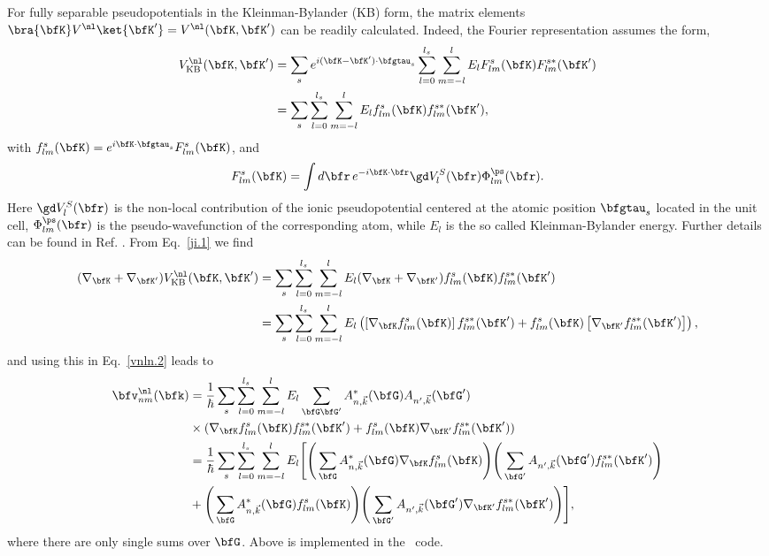 For fully  separable pseudopotentials in the  
Kleinman-Bylander (KB) form,\cite{mottaCMS10,kleinman_efficacious_1982,adolphPRB96} 
the
matrix elements 
 $\bra{\bfK}
V^\nl
\ket{\bfK'}
=V^\nl(\bfK,\bfK')
$
can be readily calculated. \cite{mottaCMS10}
Indeed,
the Fourier representation assumes 
the form,\cite{adolphPRB96,gordienkoRPJ04,fuchsCPC99}
\begin{align}\label{ji.1} 
V^\nl_{\mathrm{KB}}(\bfK,\bfK')  
 &= 
\sum_s e^{i(\bfK-\bfK')\cdot\bfgtau_s}
\sum_{l=0}^{l_s}\sum_{m=-l}^{l}E_lF_{lm}^s(\bfK)F_{lm}^{s*}(\bfK')  
\nonumber\\
 &= 
\sum_s 
\sum_{l=0}^{l_s}\sum_{m=-l}^{l}E_lf_{lm}^s(\bfK)f_{lm}^{s*}(\bfK')  
,
\end{align} 
with $f^s_{lm}(\bfK)=e^{i\bfK\cdot\bfgtau_s}F^s_{lm}(\bfK)$, and
\begin{align}\label{ji.2}
F^s_{lm}(\bfK)=\int d\bfr\,e^{-i\bfK\cdot\bfr}
\gd V^S_l(\bfr)
\Phi^\ps_{lm}(\bfr) 
.
\end{align}
Here $\gd V^S_l(\bfr)$ is the non-local contribution of the ionic
pseudopotential centered at the atomic position $\bfgtau_s$ located in
the unit cell, 
$\Phi^\ps_{lm}(\bfr)$ is the pseudo-wavefunction of the corresponding
atom, while $E_l$ is the so called 
Kleinman-Bylander energy. Further details can be found in
Ref. \cite{fuchsCPC99}.
From Eq.~\eqref{ji.1} we find
\begin{align}\label{ji.1n}
(\nabla_\bfK+\nabla_{\bfK'})  
V^\nl_{\mathrm{KB}}(\bfK,\bfK') 
 &= 
\sum_s 
\sum_{l=0}^{l_s}\sum_{m=-l}^{l}E_l 
(\nabla_\bfK+\nabla_{\bfK'})   
f_{lm}^s (\bfK)f_{lm}^{s*}(\bfK') 
\nonumber\\
 &= 
\sum_s 
\sum_{l=0}^{l_s}\sum_{m=-l}^{l}E_l 
\left(\left[\nabla_\bfK f_{lm}^s (\bfK)\right]f_{lm}^{s*}(\bfK') 
+
f_{lm}^s (\bfK) \left[\nabla_{\bfK'}  f_{lm}^{s*}(\bfK') \right]
\right),
\end{align}
and using this
 in Eq.~\eqref{vnln.2} leads to
\begin{align}\label{forg}
\bfv^\nl_{nm}(\bfk)
&=
\frac{1}{\hbar}
\sum_s
\sum_{l=0}^{l_s}\sum_{m=-l}^{l}E_l \sum_{\bfG\bfG'}
A^*_{n,\vec{k}}(\bfG)A_{n',\vec{k}}(\bfG')
\nonumber\\
&\times
( \nabla_{\bfK}f_{lm}^s(\bfK)f_{lm}^{s*}(\bfK') +
f_{lm}^s(\bfK)\nabla_{\bfK'}f_{lm}^{s*}(\bfK') ) \nonumber\\
&
=\frac{1}{\hbar}
 \sum_s \sum_{l=0}^{l_s}\sum_{m=-l}^{l}E_l \Bigg[
\Bigg(\sum_{\bfG}A^*_{n,\vec{k}}(\bfG)\nabla_{\bfK}f_{lm}^s(\bfK)\Bigg)
\Bigg(\sum_{\bfG'}A_{n',\vec{k}}(\bfG')
f_{lm}^{s*}(\bfK')\Bigg) \nonumber\\
&+
\Bigg(\sum_{\bfG}A^*_{n,\vec{k}}(\bfG)
f_{lm}^s(\bfK)\Bigg)\Bigg
(\sum_{\bfG'}A_{n',\vec{k}}(\bfG')
\nabla_{\bfK'}f_{lm}^{s*}(\bfK')\Bigg) \Bigg]
,
\end{align}
where there are only single sums over $\bfG$. 
Above is implemented in 
the \depe~code.\cite{francesco}

